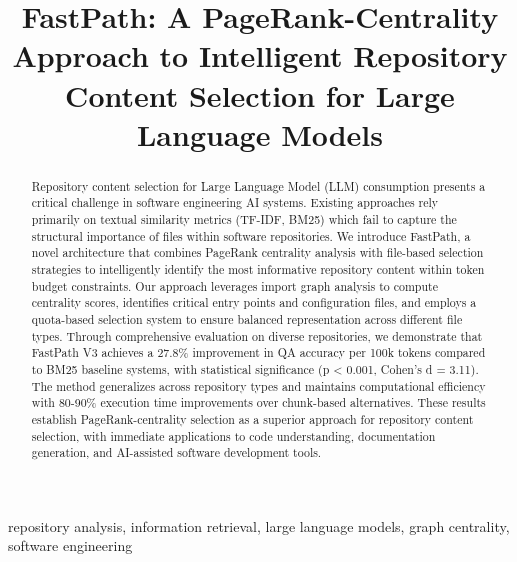\documentclass[conference]{IEEEtran}
\begin{document}
\title{FastPath: A PageRank-Centrality Approach to Intelligent Repository Content Selection for Large Language Models}

\author{
}

\maketitle

\begin{abstract}
Repository content selection for Large Language Model (LLM) consumption presents a critical challenge in software engineering AI systems. Existing approaches rely primarily on textual similarity metrics (TF-IDF, BM25) which fail to capture the structural importance of files within software repositories. We introduce FastPath, a novel architecture that combines PageRank centrality analysis with file-based selection strategies to intelligently identify the most informative repository content within token budget constraints. Our approach leverages import graph analysis to compute centrality scores, identifies critical entry points and configuration files, and employs a quota-based selection system to ensure balanced representation across different file types. Through comprehensive evaluation on diverse repositories, we demonstrate that FastPath V3 achieves a 27.8\% improvement in QA accuracy per 100k tokens compared to BM25 baseline systems, with statistical significance (p < 0.001, Cohen's d = 3.11). The method generalizes across repository types and maintains computational efficiency with 80-90\% execution time improvements over chunk-based alternatives. These results establish PageRank-centrality selection as a superior approach for repository content selection, with immediate applications to code understanding, documentation generation, and AI-assisted software development tools.
\end{abstract}

\begin{IEEEkeywords}
repository analysis, information retrieval, large language models, graph centrality, software engineering
\end{IEEEkeywords}
\end{document}
